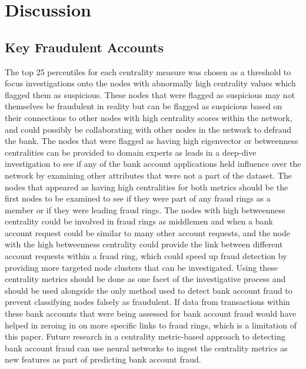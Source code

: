 \documentclass{styles/svproc}
\begin{document}
\section{Discussion}

\subsection{Key Fraudulent Accounts}
The top 25 percentiles for each centrality measure was chosen as a threshold to focus investigations onto the nodes with abnormally high centrality values which flagged them as suspicious. These nodes that were flagged as suspicious may not themselves be fraudulent in reality but can be flagged as suspicious based on their connections to other nodes with high centrality scores within the network, and could possibly be collaborating with other nodes in the network to defraud the bank. The nodes that were flagged as having high eigenvector or betweenness centralities can be provided to domain experts as leads in a deep-dive investigation to see if any of the bank account applications held influence over the network by examining other attributes that were not a part of the dataset. The nodes that appeared as having high centralities for both metrics should be the first nodes to be examined to see if they were part of any fraud rings as a member or if they were leading fraud rings. The nodes with high betweenness centrality could be involved in fraud rings as middlemen and when a bank account request could be similar to many other account requests, and the node with the high betweenness centrality could provide the link between different account requests within a fraud ring, which could speed up fraud detection by providing more targeted node clusters that can be investigated. Using these centrality metrics should be done as one facet of the investigative process and should be used alongside the only method used to detect bank account fraud to prevent classifying nodes falsely as fraudulent. If data from transactions within these bank accounts that were being assessed for bank account fraud would have helped in zeroing in on more specific links to fraud rings, which is a limitation of this paper. Future research in a centrality metric-based approach to detecting bank account fraud can use neural networks to ingest the centrality metrics as new features as part of predicting bank account fraud. 
\end{document}
